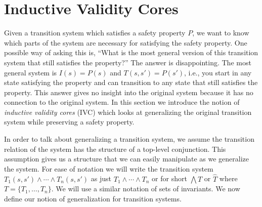 \section{Inductive Validity Cores}
\label{sec:support}

\newcommand{\bq}{\textsc{BaseQuery}\xspace}
\newcommand{\iq}{\textsc{InductiveQuery}\xspace}
\newcommand{\fq}{\textsc{FullQuery}\xspace}

\newcommand{\mink}{\textsc{MinimizeK}\xspace}
\newcommand{\reduceinv}{\textsc{ReduceInvariants}\xspace}
\newcommand{\minsupport}{\textsc{MinimizeSupport}\xspace}

\newcommand{\checksat}{\textsc{CheckSat}\xspace}
\newcommand{\unsatcore}{\textsc{UnsatCore}\xspace}
\newcommand{\unsat}{\textsc{UNSAT}\xspace}
\newcommand{\sat}{\textsc{SAT}\xspace}


Given a transition system which satisfies a safety property $P$, we
want to know which parts of the system are necessary for satisfying
the safety property. One possible way of asking this is, ``What is the
most general version of this transition system that still satisfies
the property?'' The answer is disappointing. The most general system is
$I(s) = P(s)$ and $T(s, s') = P(s')$, i.e., you start in any state
satisfying the property and can transition to any state that still
satisfies the property. This answer gives no insight into the original
system because it has no connection to the original system. In this
section we introduce the notion of {\em inductive validity cores} (IVC) 
which looks at generalizing the original transition system while 
preserving a safety property.

In order to talk about generalizing a transition system, we assume the
transition relation of the system has the structure of a top-level
conjunction. This assumption gives us a structure that we can easily
manipulate as we generalize the system. For ease of notation we will
write the transition system $T_1(s, s') \land \cdots \land T_n(s, s')$
as just $T_1 \land \cdots \land T_n$ or for short $\bigwedge T$ or %
$\widehat T$ where $T = \{T_1, \ldots, T_n\}$.  We will use a similar
notation of sets of invariants. We now define our notion of
generalization for transition systems.

  
